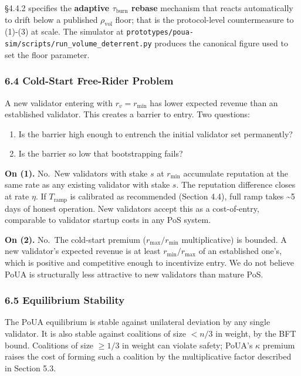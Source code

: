 \documentclass[
  11pt,
]{article}
\providecommand{\tightlist}{%
  \setlength{\itemsep}{0pt}\setlength{\parskip}{0pt}}
\begin{document}
§4.4.2 specifies the \textbf{adaptive \(\tau_{\text{burn}}\) rebase}
mechanism that reacts automatically to drift below a published
\(\rho_{\text{vol}}\) floor; that is the protocol-level countermeasure
to (1)-(3) at scale. The simulator at
\texttt{prototypes/poua-sim/scripts/run\_volume\_deterrent.py} produces
the canonical figure used to set the floor parameter.

\subsubsection{6.4 Cold-Start Free-Rider
Problem}\label{cold-start-free-rider-problem}

A new validator entering with \(r_v = r_{\min}\) has lower expected
revenue than an established validator. This creates a barrier to entry.
Two questions:

\begin{enumerate}
\def\labelenumi{\arabic{enumi}.}
\tightlist
\item
  Is the barrier high enough to entrench the initial validator set
  permanently?
\item
  Is the barrier so low that bootstrapping fails?
\end{enumerate}

\textbf{On (1).} No.~New validators with stake \(s\) at \(r_{\min}\)
accumulate reputation at the same rate as any existing validator with
stake \(s\). The reputation difference closes at rate \(\eta\). If
\(T_{\text{ramp}}\) is calibrated as recommended (Section 4.4), full
ramp takes \textasciitilde5 days of honest operation. New validators
accept this as a cost-of-entry, comparable to validator startup costs in
any PoS system.

\textbf{On (2).} No.~The cold-start premium (\(r_{\max}/r_{\min}\)
multiplicative) is bounded. A new validator's expected revenue is at
least \(r_{\min}/r_{\max}\) of an established one's, which is positive
and competitive enough to incentivize entry. We do not believe PoUA is
structurally less attractive to new validators than mature PoS.

\subsubsection{6.5 Equilibrium Stability}\label{equilibrium-stability}

The PoUA equilibrium is stable against unilateral deviation by any
single validator. It is also stable against coalitions of size \(< n/3\)
in weight, by the BFT bound. Coalitions of size \(\geq 1/3\) in weight
can violate safety; PoUA's \(\kappa\) premium raises the cost of forming
such a coalition by the multiplicative factor described in Section 5.3.
\end{document}

